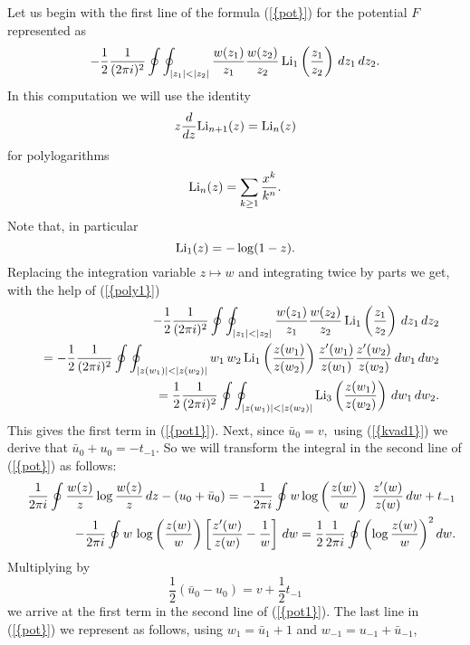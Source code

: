 \documentclass[numbook, envcountsame, envcountreset]{svjour3}
\begin{document}
{} Let us begin with the first line of the formula {(\ref{{pot}})} for the potential $F$ represented as
\begin{equation}\label{nov1}
-\frac12 \frac1{(2\pi i)^2}\oint\oint_{|z_1| < |z_2|} \frac{w(z_1)}{z_1} \frac{w(z_2)}{z_2} \,{\rm Li}_1\left(\frac{z_1}{z_2}\right) \, dz_1\, dz_2.
\end{equation}
In this computation we will use the identity
\begin{equation}\label{poly1}
z\frac{d}{dz} {\rm Li}_{n+1}(z) = {\rm Li}_n(z)
\end{equation}
for
polylogarithms
$$
{\rm Li}_n(z) =\sum_{k\geq 1} \frac{x^k}{k^n}.
$$
Note that, in particular
\begin{equation}\label{poly2}
{\rm Li}_1(z) =-\log(1-z).
\end{equation}
Replacing the integration variable $z\mapsto w$ and integrating twice by parts we get, with the help of {(\ref{{poly1}})}
\begin{eqnarray}
&&
-\frac12 \frac1{(2\pi i)^2}\oint\oint_{|z_1| < |z_2|} \frac{w(z_1)}{z_1} \frac{w(z_2)}{z_2} \,{\rm Li}_1\left(\frac{z_1}{z_2}\right) \, dz_1\, dz_2
{\nonumber}\\
&&
=-\frac12 \frac1{(2\pi i)^2}\oint\oint_{|z(w_1)| < |z(w_2)|} w_1\,  w_2 \,{\rm Li}_1\left(\frac{z(w_1)}{z(w_2)}\right)\frac{z'(w_1)}{z(w_1)} \frac{z'(w_2)}{z(w_2)}  \, dw_1\, dw_2
{\nonumber}\\
&&
=\frac12 \frac1{(2\pi i)^2}\oint\oint_{|z(w_1)| < |z(w_2)|}{\rm Li}_3\left(\frac{z(w_1)}{z(w_2)}\right)\, dw_1\, dw_2.
{\nonumber}
\end{eqnarray}
This gives the first term in {(\ref{{pot1}})}.
Next, since
$
\bar u_0  =  v,
$
using  {(\ref{{kvad1}})} we derive that $\bar u_0 +u_0=-t_{-1}$. So we will transform the integral in the second line of {(\ref{{pot}})} as follows:
\begin{eqnarray}
&&
\frac1{2\pi i} \oint \frac{w(z)}{z} \log \frac{w(z)}{z} \, dz -\left( u_0 + \bar u_0\right) =-\frac1{2\pi i} \oint w \log \left(\frac{z(w)}{w}\right) \, \frac{z'(w)}{z(w)} \, dw +t_{-1}
{\nonumber}\\
&&
-\frac1{2\pi i} \oint w \,  \log \left(\frac{z(w)}{w}\right) \left[ \frac{z'(w)}{z(w)} -\frac1{w}\right] \, dw = \frac12 \frac1{2\pi i} \oint \left(  \log \frac{z(w)}{w}\right)^2 dw.
{\nonumber}
\end{eqnarray}
Multiplying by
$$
\frac12 (\bar u_0 - u_0) = v+\frac12 t_{-1}
$$
we arrive at the first term in the second line of {(\ref{{pot1}})}. The last line in {(\ref{{pot}})} we represent as follows, using $w_1=\bar u_1 + 1$ and $w_{-1}=u_{-1}+\bar u_{-1}$,
\end{document}
